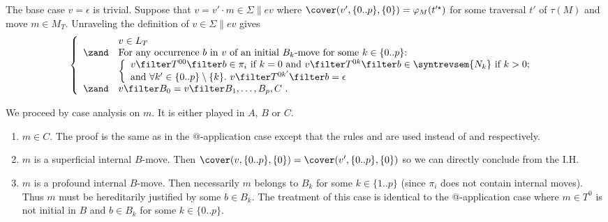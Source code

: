 \begin{itemize}[$\bullet$]
\begin{description}
    The base case $v=\epsilon$ is trivial. Suppose that $v = v' \cdot m \in  \Sigma   \| ev$  where $\cover(v', \{0..p\}, \{0\}) = \varphi_M(t'^\star)$ for some traversal $t'$ of $\tau(M)$ and move $m \in M_T$. Unraveling the definition of $v \in \Sigma \| ev$ gives
    \begin{equation}
    \left\{
    \begin{array}{ll}
              & v \in L_T \\
        \zand & \hbox{For any occurrence $b$ in $v$ of an initial $B_k$-move for some $k \in \{0..p\}$:} \\
        & \left\{\begin{array}{ll}
            v \filter T^{00} \filter b  \in \pi_i \hbox{ if $k=0$ and } v \filter T^{0k} \filter b  \in \syntrevsem{N_k} \hbox{ if $k>0$;} \\
            \hbox{and } \forall k'\in \{0..p\}\setminus\{k\} .\ v \filter T^{0k'} \filter b  = \epsilon
        \end{array}
        \right. \\
        \zand & v \filter B_0 = v \filter B_1, \ldots, B_p, C \ .
    \end{array}
    \right.
    \label{eqn:u_in_varapp_intersem}
    \end{equation}



    We proceed by case analysis on $m$. It is either played in $A$, $B$ or $C$.
        \begin{enumerate}[1.]
            \item $m\in C$. The proof is the same as in the @-application case except that the rules  and  are used instead of  and  respectively.

            \item $m$ is a superficial internal $B$-move. Then $\cover(v,\{0..p\}, \{0\}) = \cover(v', \{0..p\}, \{0\})$ so we can directly conclude from the I.H.

            \item $m$ is a profound internal $B$-move. Then necessarily $m$ belongs to $B_k$ for some $k\in \{1..p\}$ (since $\pi_i$ does not contain internal moves). Thus $m$ must be hereditarily justified by some $b \in B_k$. The treatment of this case is identical to the @-application case where $m\in T^0$ is not initial in $B$ and $b \in B_k$ for some $k\in \{0..p\}$.


\end{enumerate}
\end{description}
\end{itemize}
